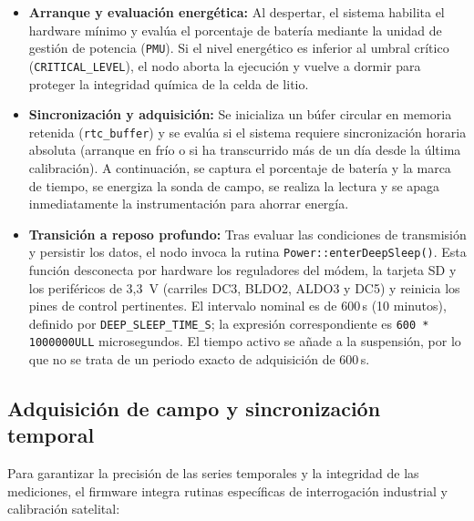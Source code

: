 \begin{itemize}
    \item \textbf{Arranque y evaluación energética:} Al despertar, el sistema habilita el hardware mínimo y evalúa el porcentaje de batería mediante la unidad de gestión de potencia (\texttt{PMU}). Si el nivel energético es inferior al umbral crítico (\texttt{CRITICAL\_LEVEL}), el nodo aborta la ejecución y vuelve a dormir para proteger la integridad química de la celda de litio.
    \item \textbf{Sincronización y adquisición:} Se inicializa un búfer circular en memoria retenida (\texttt{rtc\_buffer}) y se evalúa si el sistema requiere sincronización horaria absoluta (arranque en frío o si ha transcurrido más de un día desde la última calibración). A continuación, se captura el porcentaje de batería y la marca de tiempo, se energiza la sonda de campo, se realiza la lectura y se apaga inmediatamente la instrumentación para ahorrar energía.
    \item \textbf{Transición a reposo profundo:} Tras evaluar las condiciones de transmisión y persistir los datos, el nodo invoca la rutina \texttt{Power::enterDeepSleep()}. Esta función desconecta por hardware los reguladores del módem, la tarjeta SD y los periféricos de 3,3~V (carriles DC3, BLDO2, ALDO3 y DC5) y reinicia los pines de control pertinentes. El intervalo nominal es de 600\,s (10 minutos), definido por \texttt{DEEP\_SLEEP\_TIME\_S}; la expresión correspondiente es \texttt{600 * 1000000ULL} microsegundos. El tiempo activo se añade a la suspensión, por lo que no se trata de un periodo exacto de adquisición de 600\,s.
\end{itemize}

\subsection{Adquisición de campo y sincronización temporal}
Para garantizar la precisión de las series temporales y la integridad de las mediciones, el firmware integra rutinas específicas de interrogación industrial y calibración satelital:

